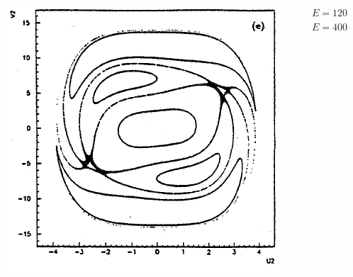 \documentclass[a4,compress]{beamer}
\begin{document}
\begin{frame}
\begin{columns}[c]
\begin{column}{0.35\textwidth}
    \includegraphics[height=0.45\textheight]{ponicare-sections-e_400}
  \end{column}
  \begin{column}{0.15\textwidth}
    \small \(E = 120\) \\
    \vspace{3cm}
    \(E = 400\)
  \end{column}
  \end{columns}
\end{frame}

\end{document}

